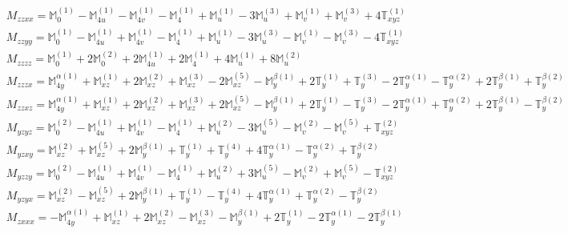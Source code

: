 \documentclass[fleqn,8pt,landscape]{jsarticle}
\begin{document}
\begin{align*}
& M_{zzxx} = \mathbb{M}_{0}^{(1)} - \mathbb{M}_{4u}^{(1)} - \mathbb{M}_{4v}^{(1)} - \mathbb{M}_{4}^{(1)} + \mathbb{M}_{u}^{(1)} - 3 \mathbb{M}_{u}^{(3)} + \mathbb{M}_{v}^{(1)} + \mathbb{M}_{v}^{(3)} + 4 \mathbb{T}_{xyz}^{(1)} \\
& M_{zzyy} = \mathbb{M}_{0}^{(1)} - \mathbb{M}_{4u}^{(1)} + \mathbb{M}_{4v}^{(1)} - \mathbb{M}_{4}^{(1)} + \mathbb{M}_{u}^{(1)} - 3 \mathbb{M}_{u}^{(3)} - \mathbb{M}_{v}^{(1)} - \mathbb{M}_{v}^{(3)} - 4 \mathbb{T}_{xyz}^{(1)} \\
& M_{zzzz} = \mathbb{M}_{0}^{(1)} + 2 \mathbb{M}_{0}^{(2)} + 2 \mathbb{M}_{4u}^{(1)} + 2 \mathbb{M}_{4}^{(1)} + 4 \mathbb{M}_{u}^{(1)} + 8 \mathbb{M}_{u}^{(2)} \\
& M_{zzzx} = \mathbb{M}_{4y}^{\alpha(1)} + \mathbb{M}_{xz}^{(1)} + 2 \mathbb{M}_{xz}^{(2)} + \mathbb{M}_{xz}^{(3)} - 2 \mathbb{M}_{xz}^{(5)} - \mathbb{M}_{y}^{\beta(1)} + 2 \mathbb{T}_{y}^{(1)} + \mathbb{T}_{y}^{(3)} - 2 \mathbb{T}_{y}^{\alpha(1)} - \mathbb{T}_{y}^{\alpha(2)} + 2 \mathbb{T}_{y}^{\beta(1)} + \mathbb{T}_{y}^{\beta(2)} \\
& M_{zzxz} = \mathbb{M}_{4y}^{\alpha(1)} + \mathbb{M}_{xz}^{(1)} + 2 \mathbb{M}_{xz}^{(2)} + \mathbb{M}_{xz}^{(3)} + 2 \mathbb{M}_{xz}^{(5)} - \mathbb{M}_{y}^{\beta(1)} + 2 \mathbb{T}_{y}^{(1)} - \mathbb{T}_{y}^{(3)} - 2 \mathbb{T}_{y}^{\alpha(1)} + \mathbb{T}_{y}^{\alpha(2)} + 2 \mathbb{T}_{y}^{\beta(1)} - \mathbb{T}_{y}^{\beta(2)} \\
& M_{yzyz} = \mathbb{M}_{0}^{(2)} - \mathbb{M}_{4u}^{(1)} + \mathbb{M}_{4v}^{(1)} - \mathbb{M}_{4}^{(1)} + \mathbb{M}_{u}^{(2)} - 3 \mathbb{M}_{u}^{(5)} - \mathbb{M}_{v}^{(2)} - \mathbb{M}_{v}^{(5)} + \mathbb{T}_{xyz}^{(2)} \\
& M_{yzxy} = \mathbb{M}_{xz}^{(2)} + \mathbb{M}_{xz}^{(5)} + 2 \mathbb{M}_{y}^{\beta(1)} + \mathbb{T}_{y}^{(1)} + \mathbb{T}_{y}^{(4)} + 4 \mathbb{T}_{y}^{\alpha(1)} - \mathbb{T}_{y}^{\alpha(2)} + \mathbb{T}_{y}^{\beta(2)} \\
& M_{yzzy} = \mathbb{M}_{0}^{(2)} - \mathbb{M}_{4u}^{(1)} + \mathbb{M}_{4v}^{(1)} - \mathbb{M}_{4}^{(1)} + \mathbb{M}_{u}^{(2)} + 3 \mathbb{M}_{u}^{(5)} - \mathbb{M}_{v}^{(2)} + \mathbb{M}_{v}^{(5)} - \mathbb{T}_{xyz}^{(2)} \\
& M_{yzyx} = \mathbb{M}_{xz}^{(2)} - \mathbb{M}_{xz}^{(5)} + 2 \mathbb{M}_{y}^{\beta(1)} + \mathbb{T}_{y}^{(1)} - \mathbb{T}_{y}^{(4)} + 4 \mathbb{T}_{y}^{\alpha(1)} + \mathbb{T}_{y}^{\alpha(2)} - \mathbb{T}_{y}^{\beta(2)} \\
& M_{zxxx} = - \mathbb{M}_{4y}^{\alpha(1)} + \mathbb{M}_{xz}^{(1)} + 2 \mathbb{M}_{xz}^{(2)} - \mathbb{M}_{xz}^{(3)} - \mathbb{M}_{y}^{\beta(1)} + 2 \mathbb{T}_{y}^{(1)} - 2 \mathbb{T}_{y}^{\alpha(1)} - 2 \mathbb{T}_{y}^{\beta(1)} \\

\end{align*}
\end{document}
